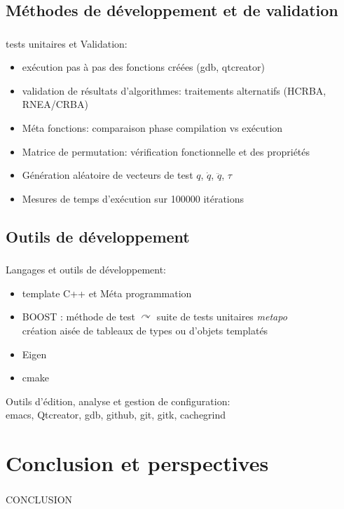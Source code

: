 \documentclass[10pt]{beamer}
\begin{document}
\subsection{Méthodes de développement et de validation}

\begin{frame}
  \frametitle{}
  
  
\end{frame}

\begin{frame}

  tests unitaires et Validation:
  \begin{itemize}
		\item exécution pas à pas des fonctions créées (gdb, qtcreator)
		\item validation de résultats d'algorithmes: traitements alternatifs (HCRBA, RNEA/CRBA)
		\item Méta fonctions: comparaison phase compilation vs exécution
		\item Matrice de permutation: vérification fonctionnelle et des propriétés 
		\item Génération aléatoire de vecteurs de test $q$, $\dot{q}$, $\ddot{q}$, $\tau$
		\item Mesures de temps d'exécution sur 100000 itérations
  \end{itemize}

\end{frame}


\subsection{Outils de développement}

\begin{frame}
  \frametitle{}
  Langages et outils de développement:
  \begin{itemize}
  \item template C++ et Méta programmation
  \item BOOST : méthode de test $\curvearrowright$ suite de tests unitaires \emph{metapo} \\
                création aisée de tableaux de types ou d'objets templatés
  \item Eigen
  \item cmake
  \end{itemize}
  
  \bigskip
  Outils d'édition, analyse et gestion de configuration:\\
  emacs, Qtcreator, gdb, github, git, gitk, cachegrind
    
\end{frame}


\section{Conclusion et perspectives}

\begin{frame}
  \frametitle{}
  
  \huge{CONCLUSION}
  
\end{frame}
\end{document}
